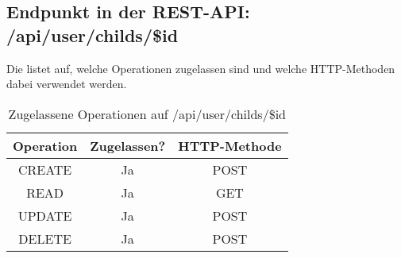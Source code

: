\subsection{Endpunkt in der REST-API: /api/user/childs/\$id}
Die  listet auf, welche Operationen zugelassen sind und welche HTTP-Methoden dabei verwendet werden. 

\begin{table}[!htbp]
	\begin{tabular}{|c|c|c|}
		\hline
			\textbf{Operation} & \textbf{Zugelassen?} & \textbf{HTTP-Methode} \\ \hline
			CREATE & Ja & POST \\ \hline 
			READ & Ja & GET \\ \hline
			UPDATE & Ja & POST \\ \hline 
			DELETE & Ja & POST \\ \hline
	\end{tabular}

		\caption{Zugelassene Operationen auf /api/user/childs/\$id}
		\label{tab:end:rest:api:user:childs:id:meth}
\end{table}

